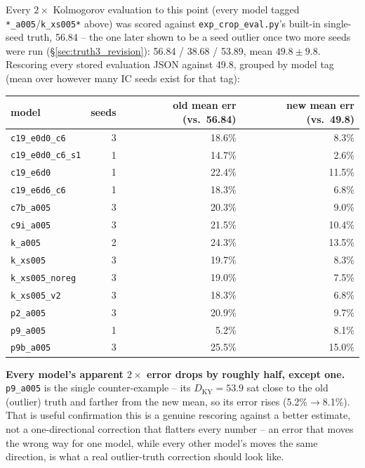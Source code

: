\documentclass[11pt]{article}
\begin{document}
Every $2\times$ Kolmogorov evaluation to this point (every model tagged
\texttt{*\_a005}/\texttt{k\_xs005*} above) was scored against
\texttt{exp\_crop\_eval.py}'s built-in single-seed truth, 56.84 -- the
one later shown to be a seed outlier once two more seeds were run
(\S\ref{sec:truth3_revision}): 56.84 / 38.68 / 53.89, mean $49.8\pm9.8$.
Rescoring every stored evaluation JSON against 49.8, grouped by model
tag (mean over however many IC seeds exist for that tag):

\begin{center}
\begin{tabular}{lrrr}
\toprule
model & seeds & old mean err (vs.\ 56.84) & new mean err (vs.\ 49.8) \\
\midrule
\texttt{c19\_e0d0\_c6}      & 3 & 18.6\% & 8.3\%  \\
\texttt{c19\_e0d0\_c6\_s1}  & 1 & 14.7\% & 2.6\%  \\
\texttt{c19\_e6d0}          & 1 & 22.4\% & 11.5\% \\
\texttt{c19\_e6d6\_c6}      & 1 & 18.3\% & 6.8\%  \\
\texttt{c7b\_a005}          & 3 & 20.3\% & 9.0\%  \\
\texttt{c9i\_a005}          & 3 & 21.5\% & 10.4\% \\
\texttt{k\_a005}            & 2 & 24.3\% & 13.5\% \\
\texttt{k\_xs005}           & 3 & 19.7\% & 8.3\%  \\
\texttt{k\_xs005\_noreg}    & 3 & 19.0\% & 7.5\%  \\
\texttt{k\_xs005\_v2}       & 3 & 18.3\% & 6.8\%  \\
\texttt{p2\_a005}           & 3 & 20.9\% & 9.7\%  \\
\texttt{p9\_a005}           & 1 & 5.2\%  & 8.1\%  \\
\texttt{p9b\_a005}          & 3 & 25.5\% & 15.0\% \\
\bottomrule
\end{tabular}
\end{center}

\textbf{Every model's apparent $2\times$ error drops by roughly half,
except one.} \texttt{p9\_a005} is the single counter-example --
its $D_{\mathrm{KY}}{=}53.9$ sat close to the old (outlier) truth and
farther from the new mean, so its error rises (5.2\%$\to$8.1\%). That
is useful confirmation this is a genuine rescoring against a better
estimate, not a one-directional correction that flatters every number --
an error that moves the wrong way for one model, while every other
model's moves the same direction, is what a real outlier-truth
correction should look like.
\end{document}
